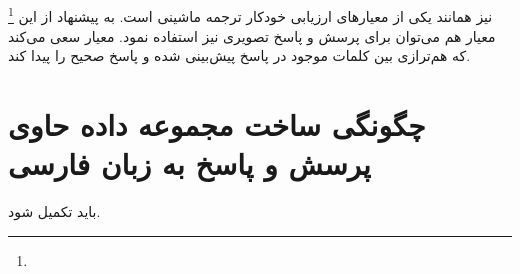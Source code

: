 \subsection{\cite{denkowski2014meteor}}
		\footnote{}
		نیز همانند
	یکی از معیارهای ارزیابی خودکار ترجمه ماشینی است. به پیشنهاد 
	\cite{gurari2018vizwiz}
	 از این معیار هم می‌توان برای پرسش و پاسخ تصویری نیز استفاده نمود. معیار 
		سعی می‌کند که هم‌ترازی بین کلمات موجود در پاسخ پیش‌بینی شده و پاسخ صحیح را پیدا کند.


\section{ چگونگی ساخت مجموعه داده حاوی پرسش و پاسخ به زبان فارسی}
باید تکمیل شود.
